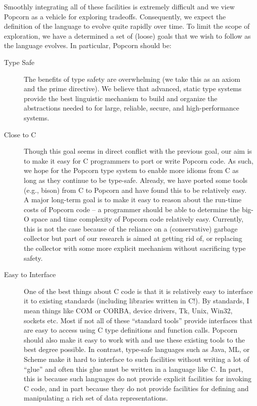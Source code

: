 \documentclass[titlepage,10pt]{article}
\begin{document}
Smoothly integrating all of these facilities is extremely difficult and
we view Popcorn as a vehicle for exploring tradeoffs.  Consequently, we
expect the definition of the language to evolve quite rapidly over time.
To limit the scope of exploration, we have a determined a set of (loose)
goals that we wish to follow as the language evolves.  In particular,
Popcorn should be: 

\begin{description}

\item [Type Safe] The benefits of type safety are overwhelming (we take
this as an axiom and the prime directive).  We believe that advanced,
static type systems provide the best linguistic mechanism to build and
organize the abstractions needed to for large, reliable, secure, and
high-performance systems.

\item [Close to C] Though this goal seems in direct conflict with the
previous goal, our aim is to make it easy for C programmers to port or
write Popcorn code.  As such, we hope for the Popcorn type system to
enable more idioms from C as long as they continue to be type-safe.
Already, we have ported some tools (e.g., bison) from C to Popcorn and
have found this to be relatively easy.  A major long-term goal is to
make it easy to reason about the run-time costs of Popcorn code -- a
programmer should be able to determine the big-O space and time
complexity of Popcorn code relatively easy.  Currently, this is not the
case because of the reliance on a (conservative) garbage collector but
part of our research is aimed at getting rid of, or replacing the
collector with some more explicit mechanism without sacrificing type
safety.

\item [Easy to Interface] One of the best things about C code is that it
is relatively easy to interface it to existing standards (including
libraries written in C!).  By standards, I mean things like COM or
CORBA, device drivers, Tk, Unix, Win32, sockets etc.  Most if not all of
these ``standard tools'' provide interfaces that are easy to access
using C type definitions and function calls.   Popcorn should also make
it easy to work with and use these existing tools to the best degree
possible.  In contrast, type-safe languages such as Java, ML, or Scheme
make it hard to interface to such facilities without writing a lot of
``glue'' and often this glue must be written in a language like C.  In
part, this is because such languages do not provide explicit facilities
for invoking C code, and in part because they do not provide facilities
for defining and manipulating a rich set of data representations.


\end{description}
\end{document}
